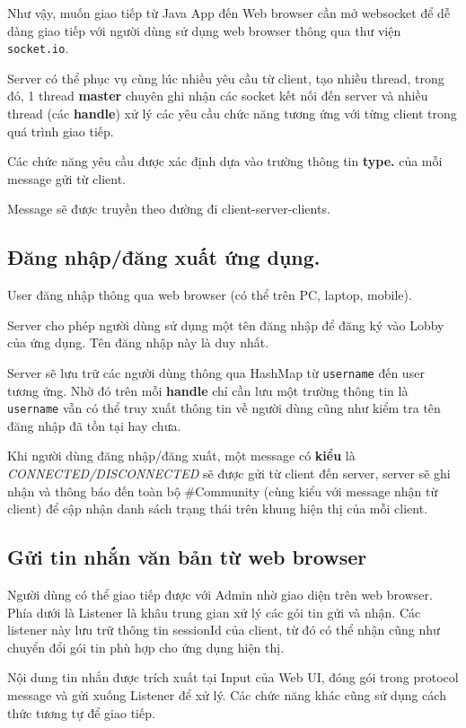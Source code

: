 \documentclass[a4paper]{article}
\begin{document}
Như vậy, muốn giao tiếp từ Java App đến Web browser cần mở websocket để dễ dàng giao tiếp với người dùng sử dụng web browser thông qua thư viện {\tt socket.io}.

Server có thể phục vụ cùng lúc nhiều yêu cầu từ client, tạo nhiều thread, trong đó, 1 thread {\bf master} chuyên ghi nhận các socket kết nối đến server và nhiều thread (các {\bf handle}) xử lý các yêu cầu chức năng tương ứng với từng client trong quá trình giao tiếp. 

Các chức năng yêu cầu được xác định dựa vào trường thông tin {\bf type.} của mỗi message gửi từ client.

Message sẽ được truyền theo đường đi client-server-clients.
\subsection{Đăng nhập/đăng xuất ứng dụng.}


User đăng nhập thông qua web browser (có thể trên PC, laptop, mobile).

Server cho phép người dùng sử dụng một tên đăng nhập để đăng ký vào Lobby của ứng dụng. Tên đăng nhập này là duy nhất. 

Server sẽ lưu trữ các người dùng thông qua HashMap từ {\tt username} đến {user} tương ứng. Nhờ đó trên mỗi {\bf handle} chỉ cần lưu một trường thông tin là {\tt username} vẫn có thể truy xuất thông tin về người dùng cũng như kiểm tra tên đăng nhập đã tồn tại hay chưa.

Khi người dùng đăng nhập/đăng xuất, một message có {\bf kiểu} là {\it CONNECTED/DISCONNECTED} sẽ được gửi từ client đến server, server sẽ ghi nhận và thông báo đến toàn bộ \#Community (cùng kiểu với message nhận từ client) để cập nhận danh sách trạng thái trên khung hiện thị của mỗi client.

\subsection{Gửi tin nhắn văn bản từ web browser}

Người dùng có thể giao tiếp được với Admin nhờ giao diện trên web browser. Phía dưới là Listener là khâu trung gian xử lý các gói tin gửi và nhận. Các listener này lưu trữ thông tin sessionId của client, từ đó có thể nhận cũng như chuyển đổi gói tin phù hợp cho ứng dụng hiện thị.

Nội dung tin nhắn được trích xuất tại Input của Web UI, đóng gói trong protocol message và gửi xuống Listener để xử lý.
Các chức năng khác cũng sử dụng cách thức tương tự để giao tiếp.
\end{document}
